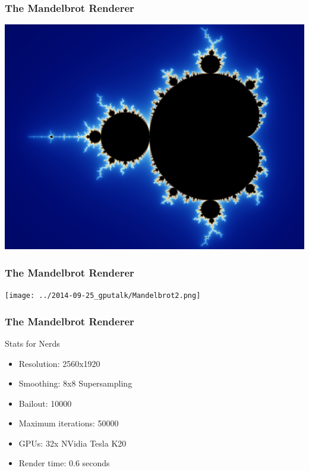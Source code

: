 \documentclass{beamer}
\begin{document}
\begin{frame}
    \frametitle{The Mandelbrot Renderer}
    \begin{center}
        \includegraphics[height=.8\textheight]{../2014-09-25_gputalk/Mandelbrot1.png}
    \end{center}
\end{frame}

\begin{frame}
    \frametitle{The Mandelbrot Renderer}
    \begin{center}
        \texttt{[image: ../2014-09-25\_gputalk/Mandelbrot2.png]}
    \end{center}
\end{frame}


\begin{frame}
    \frametitle{The Mandelbrot Renderer}
    \begin{block}{Stats for Nerds}
        \begin{itemize}
            \item Resolution: 2560x1920
            \item Smoothing: 8x8 Supersampling
            \item Bailout: 10000
            \item Maximum iterations: 50000
            \item GPUs: 32x NVidia Tesla K20
            \item Render time: \pause \alert{0.6} seconds
        \end{itemize}
    \end{block}
\end{frame}
\end{document}
